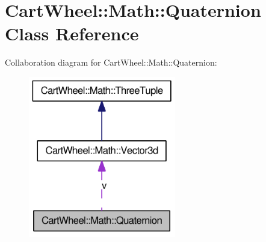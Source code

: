 \hypertarget{classCartWheel_1_1Math_1_1Quaternion}{
\section{CartWheel::Math::Quaternion Class Reference}
\label{classCartWheel_1_1Math_1_1Quaternion}
}


Collaboration diagram for CartWheel::Math::Quaternion:\nopagebreak
\begin{figure}[H]
\begin{center}
\leavevmode
\includegraphics[width=182pt]{classCartWheel_1_1Math_1_1Quaternion__coll__graph}
\end{center}
\end{figure}
